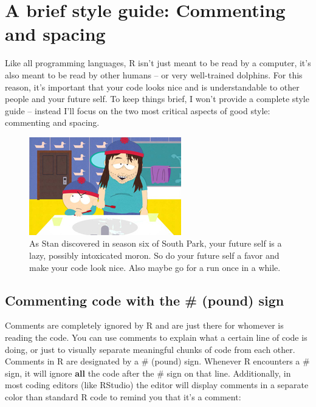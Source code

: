 \documentclass[
]{book}
\begin{document}
\hypertarget{a-brief-style-guide-commenting-and-spacing}{%
\section{A brief style guide: Commenting and spacing}\label{a-brief-style-guide-commenting-and-spacing}}

Like all programming languages, R isn't just meant to be read by a computer, it's also meant to be read by other humans -- or very well-trained dolphins. For this reason, it's important that your code looks nice and is understandable to other people and your future self. To keep things brief, I won't provide a complete style guide -- instead I'll focus on the two most critical aspects of good style: commenting and spacing.

\begin{figure}

{\centering \includegraphics[width=0.5\linewidth]{images/futureself} 

}

\caption{As Stan discovered in season six of South Park, your future self is a lazy, possibly intoxicated moron. So do your future self a favor and make your code look nice. Also maybe go for a run once in a while.}\label{fig:futureself}
\end{figure}

\hypertarget{commenting-code-with-the-pound-sign}{%
\subsection{Commenting code with the \# (pound) sign}\label{commenting-code-with-the-pound-sign}}

Comments are completely ignored by R and are just there for whomever is reading the code. You can use comments to explain what a certain line of code is doing, or just to visually separate meaningful chunks of code from each other. Comments in R are designated by a \# (pound) sign. Whenever R encounters a \# sign, it will ignore \textbf{all} the code after the \# sign on that line. Additionally, in most coding editors (like RStudio) the editor will display comments in a separate color than standard R code to remind you that it's a comment:
\end{document}
